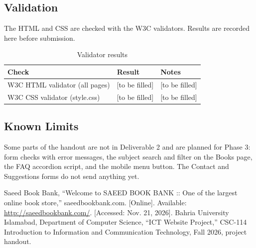 \documentclass[12pt,a4paper]{article}
\begin{document}
\subsection{Validation}
The HTML and CSS are checked with the W3C validators. Results are recorded here before submission.

\begin{table}[H]
\centering
\caption{Validator results}
\label{tab:validate}
{\small\singlespacing
\begin{tabularx}{\textwidth}{|p{4.0cm}|p{3.0cm}|Y|}
\hline
{}\textbf{Check} & \textbf{Result} & \textbf{Notes}\\
\hline
W3C HTML validator (all pages) & [to be filled] & [to be filled]\\
\hline
W3C CSS validator (style.css) & [to be filled] & [to be filled]\\
\hline
\end{tabularx}}
\end{table}

\subsection{Known Limits}
Some parts of the handout are not in Deliverable 2 and are planned for Phase 3: form checks with error messages, the subject search and filter on the Books page, the FAQ accordion script, and the mobile menu button. The Contact and Suggestions forms do not send anything yet.

\begin{thebibliography}{9}
 Saeed Book Bank, ``Welcome to SAEED BOOK BANK :: One of the largest online book store,'' saeedbookbank.com. [Online]. Available: \url{http://saeedbookbank.com/}. [Accessed: Nov. 21, 2026].
 Bahria University Islamabad, Department of Computer Science, ``ICT Website Project,'' CSC-114 Introduction to Information and Communication Technology, Fall 2026, project handout.
\end{thebibliography}
\end{document}
